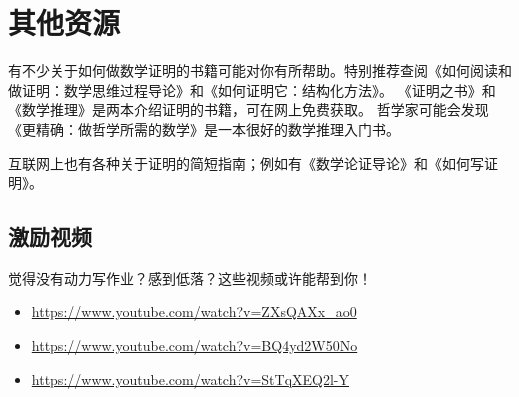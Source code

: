 \documentclass[../../../include/open-logic-section]{subfiles}
\begin{document}

\section{其他资源}

有不少关于如何做数学证明的书籍可能对你有所帮助。特别推荐查阅《如何阅读和做证明：数学思维过程导论》\citep{Solow2013}和《如何证明它：结构化方法》\citep{Velleman2019}。
《证明之书》\citep{Hammack2013}和《数学推理》\citep{Sandstrum2019}是两本介绍证明的书籍，可在网上免费获取。
哲学家可能会发现《更精确：做哲学所需的数学》\citep{Steinhart2018}是一本很好的数学推理入门书。

互联网上也有各种关于证明的简短指南；例如有《数学论证导论》\citep{Hutchings2003}和《如何写证明》\citep{Cheng2004}。

\subsection{激励视频}

觉得没有动力写作业？感到低落？这些视频或许能帮到你！

\begin{itemize}
\item \url{https://www.youtube.com/watch?v=ZXsQAXx_ao0}
\item \url{https://www.youtube.com/watch?v=BQ4yd2W50No}
\item \url{https://www.youtube.com/watch?v=StTqXEQ2l-Y}
\end{itemize}
\end{document}
